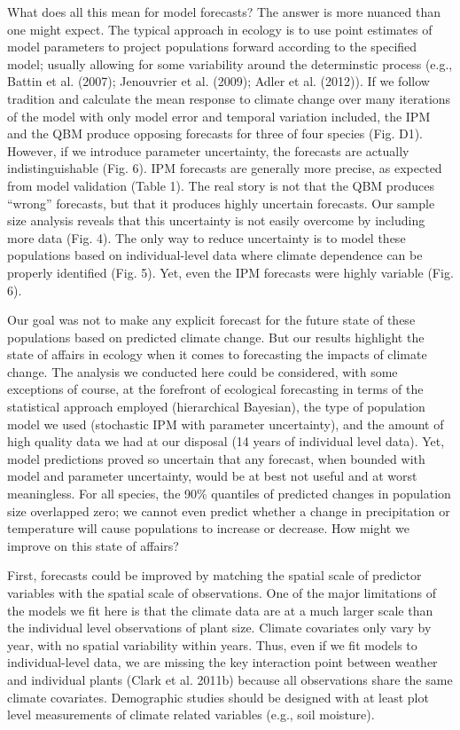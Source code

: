 \documentclass[12pt,]{article}
\begin{document}
What does all this mean for model forecasts? The answer is more nuanced
than one might expect. The typical approach in ecology is to use point
estimates of model parameters to project populations forward according
to the specified model; usually allowing for some variability around the
determinstic process (e.g., Battin et al. (2007); Jenouvrier et al.
(2009); Adler et al. (2012)). If we follow tradition and calculate the
mean response to climate change over many iterations of the model with
only model error and temporal variation included, the IPM and the QBM
produce opposing forecasts for three of four species (Fig. D1). However,
if we introduce parameter uncertainty, the forecasts are actually
indistinguishable (Fig. 6). IPM forecasts are generally more precise, as
expected from model validation (Table 1). The real story is not that the
QBM produces ``wrong'' forecasts, but that it produces highly uncertain
forecasts. Our sample size analysis reveals that this uncertainty is not
easily overcome by including more data (Fig. 4). The only way to reduce
uncertainty is to model these populations based on individual-level data
where climate dependence can be properly identified (Fig. 5). Yet, even
the IPM forecasts were highly variable (Fig. 6).

Our goal was not to make any explicit forecast for the future state of
these populations based on predicted climate change. But our results
highlight the state of affairs in ecology when it comes to forecasting
the impacts of climate change. The analysis we conducted here could be
considered, with some exceptions of course, at the forefront of
ecological forecasting in terms of the statistical approach employed
(hierarchical Bayesian), the type of population model we used
(stochastic IPM with parameter uncertainty), and the amount of high
quality data we had at our disposal (14 years of individual level data).
Yet, model predictions proved so uncertain that any forecast, when
bounded with model and parameter uncertainty, would be at best not
useful and at worst meaningless. For all species, the 90\% quantiles of
predicted changes in population size overlapped zero; we cannot even
predict whether a change in precipitation or temperature will cause
populations to increase or decrease. How might we improve on this state
of affairs?

First, forecasts could be improved by matching the spatial scale of
predictor variables with the spatial scale of observations. One of the
major limitations of the models we fit here is that the climate data are
at a much larger scale than the individual level observations of plant
size. Climate covariates only vary by year, with no spatial variability
within years. Thus, even if we fit models to individual-level data, we
are missing the key interaction point between weather and individual
plants (Clark et al. 2011b) because all observations share the same
climate covariates. Demographic studies should be designed with at least
plot level measurements of climate related variables (e.g., soil
moisture).
\end{document}

